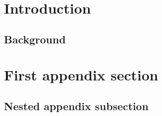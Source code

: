 \section{Introduction}

\subsection{Background}
\appendix
\section{First appendix section}

\subsection{Nested appendix subsection}
